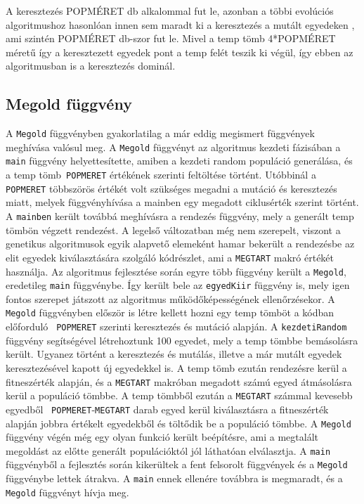 \documentclass[12ppt,a4paper,oneside]{report}
\begin{document}
            
            A keresztezés POPMÉRET db alkalommal fut le, azonban a többi evolúciós algoritmushoz hasonlóan innen sem maradt ki a keresztezés a mutált egyedeken , ami szintén POPMÉRET db-szor fut le.
            Mivel a temp tömb 4*POPMÉRET méretű így a keresztezett egyedek pont a temp felét teszik ki végül, így ebben az algoritmusban is a keresztezés dominál.

        \subsection{Megold függvény} %
            	A \texttt{Megold} függvényben gyakorlatilag a már eddig megismert függvények meghívása valósul meg.
	A \texttt{Megold} függvényt az algoritmus kezdeti fázisában a  \texttt{main} függvény helyettesítette, amiben a kezdeti random populáció generálása, és a temp tömb\texttt{ POPMERET} értékének szerinti feltöltése történt. Utóbbinál a \texttt{ POPMERET} többszörös értékét volt szükséges megadni a mutáció és keresztezés miatt, melyek függvényhívása a mainben egy megadott ciklusérték szerint történt. A  \texttt{mainben} került továbbá meghívásra a rendezés függvény, mely a generált temp tömbön végzett rendezést. A legelső változatban még nem szerepelt, viszont a genetikus algoritmusok egyik alapvető elemeként hamar bekerült a rendezésbe az elit egyedek kiválasztására szolgáló kódrészlet, ami a \texttt{MEGTART} makró értékét használja.
	Az algoritmus fejlesztése során egyre több függvény került a \texttt{Megold}, eredetileg \texttt{main} függvénybe. Így került bele az \texttt{egyedKiir} függvény is, mely igen fontos szerepet játszott az algoritmus működőképességének ellenőrzésekor.
A \texttt{Megold} függvényben először is létre kellett hozni egy temp tömböt a kódban előforduló \texttt{ POPMERET} szerinti keresztezés és mutáció alapján. A \texttt{kezdetiRandom} függvény segítségével létrehoztunk 100 egyedet, mely a temp tömbbe bemásolásra került. 		Ugyanez történt a keresztezés és mutálás, illetve a már mutált egyedek keresztezésével kapott új egyedekkel is. 
	A temp tömb ezután rendezésre kerül a fitneszérték alapján, és a \texttt{MEGTART}  makróban megadott számú egyed átmásolásra kerül a populáció tömbbe. A temp tömbből ezután a \texttt{MEGTART}  számmal kevesebb egyedből \texttt{ POPMERET}-\texttt{MEGTART}  darab egyed kerül kiválasztásra a fitneszérték alapján jobbra értékelt egyedekből és töltődik be a populáció tömbbe.
A \texttt{Megold} függvény végén még egy olyan funkció került beépítésre, ami a megtalált megoldást az előtte generált populációktól jól láthatóan elválasztja.
A  \texttt{main} függvényből a fejlesztés során kikerültek a fent felsorolt függvények és a \texttt{Megold} függvénybe lettek átrakva.  A  \texttt{main} ennek ellenére továbbra is megmaradt, és a \texttt{Megold} függvényt hívja meg.
\end{document}
